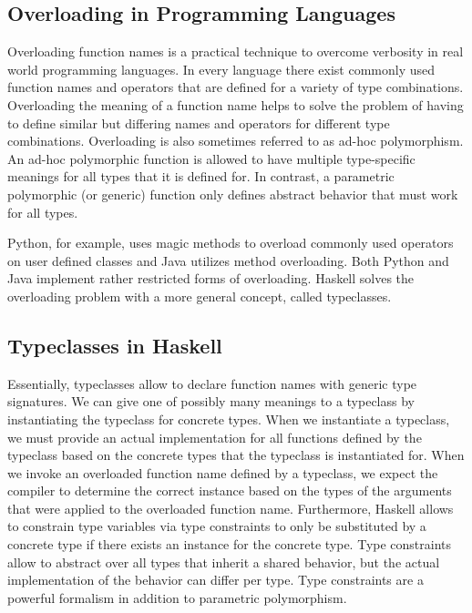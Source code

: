 \subsection{Overloading in Programming Languages}
Overloading function names is a practical technique to overcome verbosity in real world programming languages. 
In every language there exist commonly used function names and operators that are defined for a variety of type combinations.
Overloading the meaning of a function name helps to solve the problem of having to define similar but differing names and operators for different type combinations. 
Overloading is also sometimes referred to as ad-hoc polymorphism. 
An ad-hoc polymorphic function is allowed to have multiple type-specific meanings for all types that it is defined for. 
In contrast, a parametric polymorphic (or generic) function only defines abstract behavior that must work for all types.

\noindent Python, for example, uses magic methods to overload commonly used operators on user defined classes and Java utilizes method overloading. 
Both Python and Java implement rather restricted forms of overloading. 
Haskell solves the overloading problem with a more general concept, called typeclasses.

\subsection{Typeclasses in Haskell}
Essentially, typeclasses allow to declare function names with generic type signatures.
We can give one of possibly many meanings to a typeclass by instantiating the typeclass for concrete types. 
When we instantiate a typeclass, we must provide an actual implementation for all functions defined by the typeclass based on the concrete types that the typeclass is instantiated for.
When we invoke an overloaded function name defined by a typeclass, we expect the compiler to determine the correct instance based on the types of the arguments that were applied to the overloaded function name. 
Furthermore, Haskell allows to constrain type variables via type constraints to only be substituted by a concrete type if there exists an instance for the concrete type. 
Type constraints allow to abstract over all types that inherit a shared behavior, but the actual implementation of the behavior can differ per type. Type constraints are a powerful formalism in addition to parametric polymorphism.

